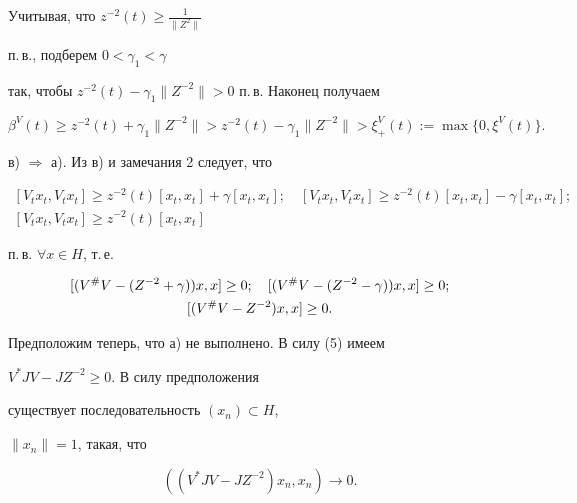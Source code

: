Учитывая, что $z^{-2}(t)\geq \frac{1}{\| Z^{2}\| }$


п.\,в., подберем $0<\gamma_1<\gamma$


так, чтобы $z^{-2}(t)-\gamma_{1}\| Z^{-2}\| >0$ п.\,в. Наконец получаем


$$


\beta^{V}(t)\geq z^{-2}(t)+\gamma_{1}\| Z^{-2}\| >z^{-2}


(t)-\gamma_{1}\| Z^{-2}\| >\xi_{+}^{V}(t):=\max\{0,\xi^{V}(t)\}.


$$





в) $\Rightarrow $ а). Из в) и замечания 2 следует, что


\begin{gather*}


[V_{t}x_{t},V_{t}x_{t}]\geq


z^{-2}(t)[x_{t},x_{t}]+\gamma [x_{t},x_{t}];\quad


[V_{t}x_{t},V_{t}x_{t}]\geq


z^{-2}(t)[x_{t},x_{t}]-\gamma [x_{t},x_{t}]; \\


%


[V_{t}x_{t},V_{t}x_{t}]\geq z^{-2}(t)[x_{t},x_{t}]


\end{gather*}


п.\,в. $\forall x\in H$, т.\,е.


\begin{gather}


[(V^{\#}V-(Z^{-2}+\gamma))x,x]\geq 0;


\quad [(V^{\#}V-(Z^{-2}-\gamma))x,x]\geq 0; \notag \\


%


[(V^{\#}V-Z^{-2})x,x]\geq 0.


\end{gather}





Предположим теперь, что а) не выполнено. В силу (5) имеем


$V^{*}JV-JZ^{-2}\geq 0$. В силу предположения


существует последовательность $(x_{n})\subset H$,


$\|x_{n}\| =1$, такая, что


\begin{equation}


((V^{*}JV-JZ^{-2})x_{n},x_{n})\to 0.


\end{equation}


